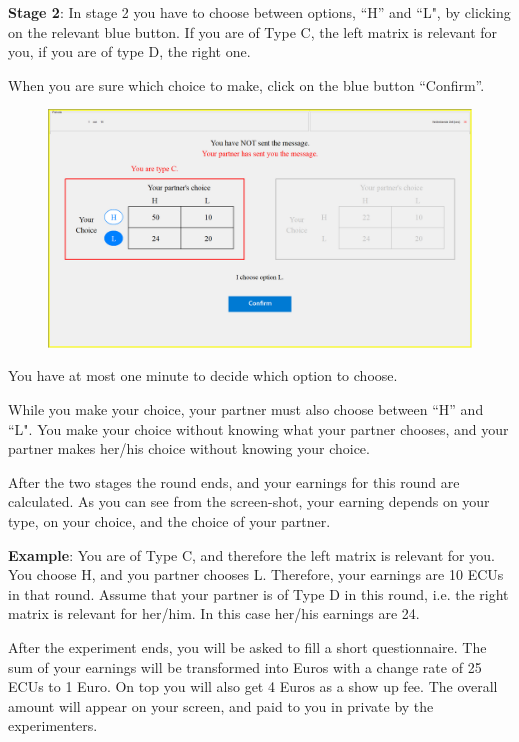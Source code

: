 \documentclass[12pt]{article}
\theoremstyle{break}
\begin{document}
\textbf{Stage 2}: In stage 2 you have to choose between options, ``H'' and ``L", by clicking on the relevant blue button. 
If you are of Type C, the left matrix is relevant for you, if you are of type D, the right one.

When you are sure which choice to make, click on the blue button ``Confirm''.

\begin{figure}[h]
  \centering
    \includegraphics[width=.9\textwidth]{fig3-CT-instructions.png}
  \label{fig:fig3-CT-instructions}
\end{figure}

 
You have at most one minute to decide which option to choose.

While you make your choice, your partner must also choose between ``H'' and ``L". You make your choice without knowing what your partner chooses, and your partner makes her/his choice without knowing your choice. 

After the two stages the round ends, and your earnings for this round are calculated. As you can see from the screen-shot, your earning depends on your type, on your choice, and the choice of your partner. 

\textbf{Example}: You are of Type C, and therefore the left matrix is relevant for you. You choose H, and you partner chooses L. Therefore, your earnings are 10 ECUs in that round. Assume that your partner is of Type D in this round, i.e. the right matrix is relevant for her/him. In this case her/his earnings are 24. 

After the experiment ends, you will be asked to fill a short questionnaire. The sum of your earnings will be transformed into Euros with a change rate of 25 ECUs to 1 Euro. On top you will also get 4 Euros as a show up fee. The overall amount will appear on your screen, and paid to you in private by the experimenters. 
\end{document}
